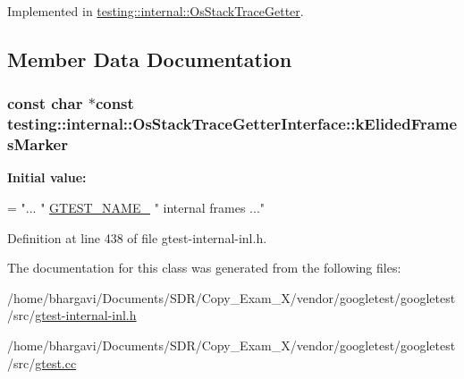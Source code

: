 Implemented in \hyperlink{classtesting_1_1internal_1_1_os_stack_trace_getter_a8ae0237629b6b5672b4b5ef8e292205c}{testing\+::internal\+::\+Os\+Stack\+Trace\+Getter}.



\subsection{Member Data Documentation}
\subsubsection[{\texorpdfstring{k\+Elided\+Frames\+Marker}{kElidedFramesMarker}}]{\setlength{\rightskip}{0pt plus 5cm}const char $\ast$const testing\+::internal\+::\+Os\+Stack\+Trace\+Getter\+Interface\+::k\+Elided\+Frames\+Marker\hspace{0.3cm}{\ttfamily [static]}}\hypertarget{classtesting_1_1internal_1_1_os_stack_trace_getter_interface_a669c49ce9ae05935e70bddb35a81ceb8}{}\label{classtesting_1_1internal_1_1_os_stack_trace_getter_interface_a669c49ce9ae05935e70bddb35a81ceb8}
{\bfseries Initial value\+:}
\begin{DoxyCode}
=
    \textcolor{stringliteral}{"... "} \hyperlink{gtest-port_8h_a13d98c217176bd8722c395b9225fc19d}{GTEST\_NAME\_} \textcolor{stringliteral}{" internal frames ..."}
\end{DoxyCode}


Definition at line 438 of file gtest-\/internal-\/inl.\+h.



The documentation for this class was generated from the following files\+:\begin{DoxyCompactItemize}
\item 
/home/bhargavi/\+Documents/\+S\+D\+R/\+Copy\+\_\+\+Exam\+\_\+X/vendor/googletest/googletest/src/\hyperlink{gtest-internal-inl_8h}{gtest-\/internal-\/inl.\+h}\item 
/home/bhargavi/\+Documents/\+S\+D\+R/\+Copy\+\_\+\+Exam\+\_\+X/vendor/googletest/googletest/src/\hyperlink{gtest_8cc}{gtest.\+cc}\end{DoxyCompactItemize}
